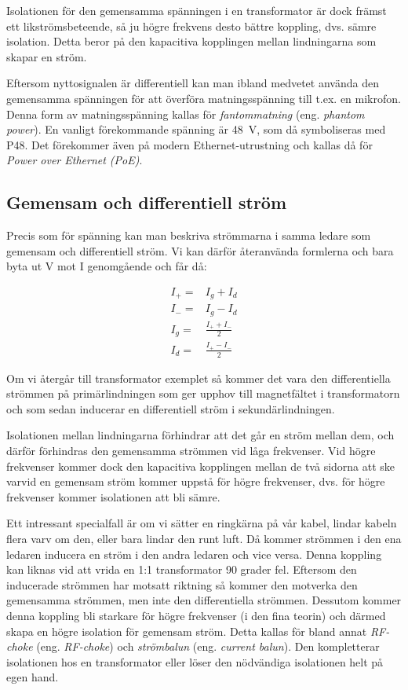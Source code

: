 Isolationen för den gemensamma spänningen i en transformator är dock främst ett
likströmsbeteende, så ju högre frekvens desto bättre koppling, dvs. sämre
isolation. Detta beror på den kapacitiva kopplingen mellan lindningarna som
skapar en ström.

Eftersom nyttosignalen är differentiell kan man ibland medvetet använda den
gemensamma spänningen för att överföra matningsspänning till t.ex. en mikrofon.
Denna form av matningsspänning kallas för \emph{fantommatning}
(eng. \emph{phantom power}). En vanligt förekommande spänning är 48~V, som då
symboliseras med P48. Det förekommer även på modern Ethernet-utrustning och
kallas då för \emph{Power over Ethernet (PoE)}.

\subsection{Gemensam och differentiell ström}
\label{comdiffi}

Precis som för spänning kan man beskriva strömmarna i samma ledare som
gemensam och differentiell ström. Vi kan därför återanvända formlerna och bara
byta ut V mot I genomgående och får då:

\begin{eqnarray}
I_+ = & I_g + I_d\\
I_- = & I_g - I_d\\
I_g = & \frac{I_+ + I_-}{2}\\
I_d = & \frac{I_+ - I_-}{2}
\end{eqnarray}

Om vi återgår till transformator exemplet så kommer det vara den differentiella
strömmen på primärlindningen som ger upphov till magnetfältet i transformatorn
och som sedan inducerar en differentiell ström i sekundärlindningen.

Isolationen mellan lindningarna förhindrar att det går en ström mellan dem,
och därför förhindras den gemensamma strömmen vid låga frekvenser. Vid högre
frekvenser kommer dock den kapacitiva kopplingen mellan de två sidorna att
ske varvid en gemensam ström kommer uppstå för högre frekvenser, dvs. för
högre frekvenser kommer isolationen att bli sämre.

Ett intressant specialfall är om vi sätter en ringkärna på vår kabel, lindar
kabeln flera varv om den, eller bara lindar den runt luft. Då kommer strömmen
i den ena ledaren inducera en ström i den andra ledaren och vice versa.
Denna koppling kan liknas vid att vrida en 1:1 transformator 90 grader fel.
Eftersom den inducerade strömmen har motsatt riktning så kommer den motverka
den gemensamma strömmen, men inte den differentiella strömmen. Dessutom kommer
denna koppling bli starkare för högre frekvenser (i den fina teorin) och
därmed skapa en högre isolation för gemensam ström. Detta kallas för
bland annat \emph{RF-choke} (eng. \emph{RF-choke}) och \emph{strömbalun} (eng.
\emph{current balun}). Den kompletterar isolationen hos en transformator
eller löser den nödvändiga isolationen helt på egen hand.

